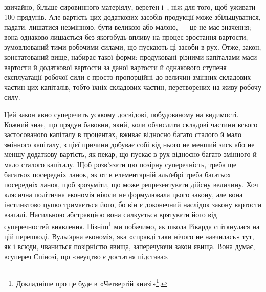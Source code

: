 \parcont{}  %
звичайно, більше сировинного матеріялу, веретен і~, ніж
для того, щоб уживати 100 прядунів. Але вартість цих додаткових
засобів продукції може збільшуватися, падати, лишатися незмінною,
бути великою або малою, — це не має значення; вона однаково
лишається без якогобудь впливу на процес зростання вартости,
зумовлюваний тими робочими силами, що пускають ці
засоби в рух. Отже, закон, констатований вище, набирає такої
форми: продуковані різними капіталами маси вартости й додаткової
вартости за даної вартости й однакового ступеня експлуатації
робочої сили є просто пропорційні до величин змінних складових
частин цих капіталів, тобто їхніх складових частин, перетворених
на живу робочу силу.

Цей закон явно суперечить усякому досвідові, побудованому
на видимості. Кожний знає, що прядун бавовни, який, коли
обчислити складові частини всього застосованого капіталу в процентах,
вживає відносно багато сталого й мало змінного капіталу,
з цієї причини добуває собі від нього не менший зиск або не меншу
додаткову вартість, як пекар, що пускає в рух відносно багато
змінного й мало сталого капіталу. Щоб розв’язати цю позірну
суперечність, треба ще багатьох посередніх ланок, як от в елементарній
альґебрі треба багатьох посередніх ланок, щоб зрозуміти,
що  може репрезентувати дійсну величину. Хоч клясична політична
економія ніколи не формулювала цього закону, але вона
інстинктово цупко тримається його, бо він є доконечний наслідок
закону вартости взагалі. Насильною абстракцією вона силкується
врятувати його від суперечностей виявлення. Пізніш\footnote{
Докладніше про це буде в «Четвертій книзі»\footnote*{
Мова йде про «Теорії додаткової вартости», що їх Маркс мав на
думці видати як «Четверту книгу Капіталу». \emph{Ред.}
}.
}
ми побачимо, як школа Рікарда спіткнулася на цій перешкоді.
Вульґарна економія, яка «справді таки нічого не навчилась»
тут, як і всюди, чваниться позірністю явища, заперечуючи закон
явища. Вона думає, всупереч Спінозі, що «неуцтво є достатня
підстава».

